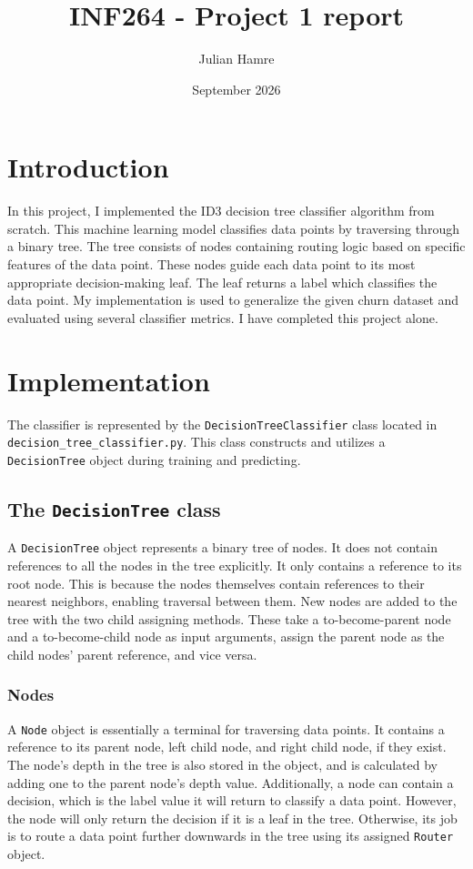 \documentclass{article}
\title{INF264 - Project 1 report}
\author{Julian Hamre}
\date{September 2026}
\begin{document}
\maketitle
\tableofcontents
\newpage

\section{Introduction}

In this project, I implemented the ID3 decision tree classifier algorithm from scratch.
This machine learning model classifies data points by traversing through a binary tree.
The tree consists of nodes containing routing logic based on specific features of the data point.
These nodes guide each data point to its most appropriate decision-making leaf.
The leaf returns a label which classifies the data point.
My implementation is used to generalize the given churn dataset 
and evaluated using several classifier metrics.
I have completed this project alone.

\section{Implementation}

The classifier is represented by the \texttt{DecisionTreeClassifier} class
located in \texttt{decision\_tree\_classifier.py}. This class constructs and utilizes a
\texttt{DecisionTree} object during training and predicting.

\subsection{The \texttt{DecisionTree} class}

A \texttt{DecisionTree} object represents a binary tree of nodes.
It does not contain references to all the nodes in the tree explicitly.
It only contains a reference to its root node. 
This is because the nodes themselves contain references to their nearest neighbors,
enabling traversal between them. 
New nodes are added to the tree with the two child assigning methods.
These take a to-become-parent node and a to-become-child node as input arguments,
assign the parent node as the child nodes' parent reference, and vice versa.

\subsubsection{Nodes}

A \texttt{Node} object is essentially a terminal for traversing data points.
It contains a reference to its parent node, left child node, and right child node, if they exist.
The node's depth in the tree is also stored in the object, 
and is calculated by adding one to the parent node's depth value.
Additionally, a node can contain a decision, which is the label value it will return
to classify a data point.
However, the node will only return the decision if it is a leaf in the tree.
Otherwise, its job is to route a data point further downwards in the tree
using its assigned \texttt{Router} object.
\end{document}
